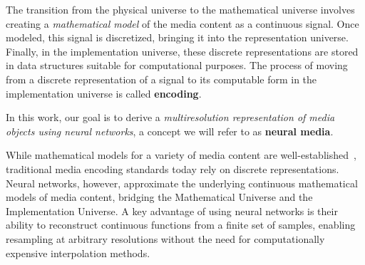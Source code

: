 The transition from the physical universe to the mathematical universe involves creating a \textit{mathematical model} of the media content as a continuous signal. Once modeled, this signal is discretized, bringing it into the representation universe. Finally, in the implementation universe, these discrete representations are stored in data structures suitable for computational purposes. The process of moving from a discrete representation of a signal to its computable form in the implementation universe is called \textbf{encoding}. 


In this work, our goal is to derive a \textit{multiresolution representation of media objects using neural networks}, a concept we will refer to as \textbf{neural media}. 


While mathematical models for a variety of media content are well-established~\citep{ ipcgVelho2014, wenger2013isosurfaces}, traditional media encoding standards today rely on discrete representations. Neural networks, however, approximate the underlying continuous mathematical models of media content, bridging the Mathematical Universe and the Implementation Universe. A key advantage of using neural networks is their ability to reconstruct continuous functions from a finite set of samples, enabling resampling at arbitrary resolutions without the need for computationally expensive interpolation methods.


